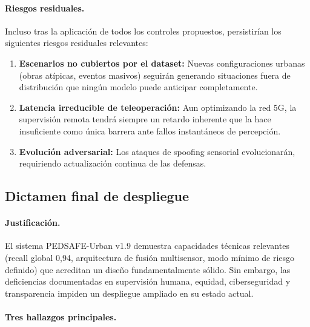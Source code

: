 \documentclass[11pt]{article}
\begin{document}
\paragraph{Riesgos residuales.} Incluso tras la aplicación de todos los controles propuestos, persistirían los siguientes riesgos residuales relevantes:
\begin{enumerate}[nosep]
    \item \textbf{Escenarios no cubiertos por el dataset:} Nuevas configuraciones urbanas (obras atípicas, eventos masivos) seguirán generando situaciones fuera de distribución que ningún modelo puede anticipar completamente.
    \item \textbf{Latencia irreducible de teleoperación:} Aun optimizando la red 5G, la supervisión remota tendrá siempre un retardo inherente que la hace insuficiente como única barrera ante fallos instantáneos de percepción.
    \item \textbf{Evolución adversarial:} Los ataques de spoofing sensorial evolucionarán, requiriendo actualización continua de las defensas.
\end{enumerate}

\subsection{Dictamen final de despliegue}

\begin{center}
\end{center}

\paragraph{Justificación.} El sistema PEDSAFE-Urban v1.9 demuestra capacidades técnicas relevantes (recall global 0,94, arquitectura de fusión multisensor, modo mínimo de riesgo definido) que acreditan un diseño fundamentalmente sólido. Sin embargo, las deficiencias documentadas en supervisión humana, equidad, ciberseguridad y transparencia impiden un despliegue ampliado en su estado actual.

\paragraph{Tres hallazgos principales.}~\\
\end{document}

